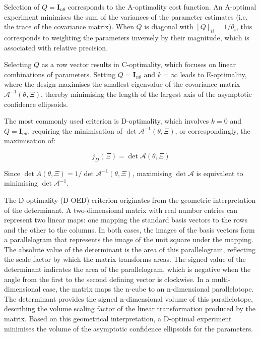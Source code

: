 \documentclass[a4paper,fleqn]{cas-dc}
\begin{document}
		Selection of $Q = \mathbf{I}_{n\theta}$ corresponds to the A-optimality cost function. An A-optimal experiment minimises the sum of the variances of the parameter estimates (i.e. the trace of the covariance matrix). When $Q$ is diagonal with $[Q]_{ii} = 1/\theta_i$, this corresponds to weighting the parameters inversely by their magnitude, which is associated with relative precision.
		
		Selecting $Q$ as a row vector results in C-optimality, which focuses on linear combinations of parameters. Setting $Q = \mathbf{I}_{n\theta}$ and $k = \infty$ leads to E-optimality, where the design maximises the smallest eigenvalue of the covariance matrix $\mathcal{A}^{-1}(\theta, \Xi)$, thereby minimising the length of the largest axis of the asymptotic confidence ellipsoids.
		
		The most commonly used criterion is D-optimality, which involves $k = 0$ and $Q = \mathbf{I}_{n\theta}$, requiring the minimisation of $\det \mathcal{A}^{-1}(\theta, \Xi)$, or correspondingly, the maximisation of:
		
		{\footnotesize \begin{equation} j_D(\Xi) = \det \mathcal{A}(\theta, \Xi) \end{equation} }
		
		Since $\det A(\theta, \Xi) = 1 / \det \mathcal{A}^{-1}(\theta, \Xi)$, maximising $\det \mathcal{A}$ is equivalent to minimising $\det \mathcal{A}^{-1}$.
		
		The D-optimality (D-OED) criterion originates from the geometric interpretation of the determinant. A two-dimensional matrix with real number entries can represent two linear maps: one mapping the standard basis vectors to the rows and the other to the columns. In both cases, the images of the basis vectors form a parallelogram that represents the image of the unit square under the mapping. The absolute value of the determinant is the area of this parallelogram, reflecting the scale factor by which the matrix transforms areas. The signed value of the determinant indicates the area of the parallelogram, which is negative when the angle from the first to the second defining vector is clockwise. In a multi-dimensional case, the matrix maps the n-cube to an n-dimensional parallelotope. The determinant provides the signed n-dimensional volume of this parallelotope, describing the volume scaling factor of the linear transformation produced by the matrix. Based on this geometrical interpretation, a D-optimal experiment minimises the volume of the asymptotic confidence ellipsoids for the parameters.
		
\end{document}
